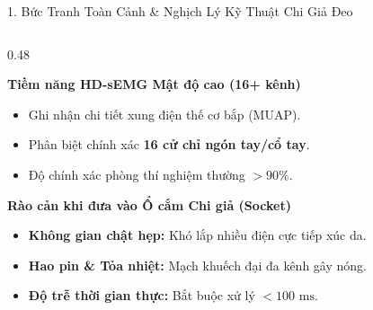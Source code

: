 \documentclass[aspectratio=169,10pt]{beamer}
\begin{document}
\begin{frame}{1. Bức Tranh Toàn Cảnh \& Nghịch Lý Kỹ Thuật Chi Giả Đeo}
    \begin{columns}[T]
        \begin{column}{0.48\textwidth}
            \begin{block}{\textbf{Tiềm năng HD-sEMG Mật độ cao (16+ kênh)}}
                \footnotesize
                \begin{itemize}
                    \item Ghi nhận chi tiết xung điện thế cơ bắp (MUAP).
                    \item Phân biệt chính xác \textbf{16 cử chỉ ngón tay/cổ tay}.
                    \item Độ chính xác phòng thí nghiệm thường $> 90\%$.
                \end{itemize}
            \end{block}
            \vspace{0.1cm}
            \begin{alertblock}{\textbf{Rào cản khi đưa vào Ổ cắm Chi giả (Socket)}}
                \footnotesize
                \begin{itemize}
                    \item \textbf{Không gian chật hẹp:} Khó lắp nhiều điện cực tiếp xúc da.
                    \item \textbf{Hao pin \& Tỏa nhiệt:} Mạch khuếch đại đa kênh gây nóng.
                    \item \textbf{Độ trễ thời gian thực:} Bắt buộc xử lý $< 100\text{ ms}$.
                \end{itemize}
            \end{alertblock}
        \end{column}
        

\end{columns}
\end{frame}
\end{document}
